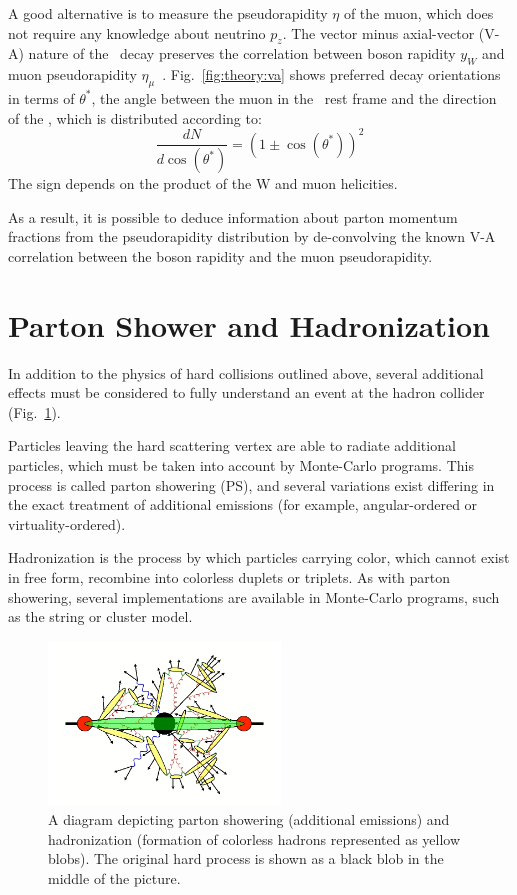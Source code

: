 A good alternative is to measure the pseudorapidity $\eta$ of the muon, which does not require any knowledge about neutrino $p_z$. The vector minus axial-vector (V-A) nature of the \Wboson\ decay preserves the correlation between boson rapidity $y_W$ and muon pseudorapidity $\eta_\mu$~\cite{MartinezOutschoorn:2011hta}. Fig.~\ref{fig:theory:va} shows preferred decay orientations in terms of $\theta^*$, the angle between the muon in the \Wboson\ rest frame and the direction of the \Wboson, which is distributed according to:
$$ \frac{dN}{d \cos(\theta^*)} = \left(1 \pm \cos(\theta^*) \right)^{2}$$
The sign depends on the product of the W and muon helicities.

As a result, it is possible to deduce information about parton momentum fractions from the pseudorapidity distribution by de-convolving the known V-A correlation between the boson rapidity and the muon pseudorapidity.

\section{Parton Shower and Hadronization}

In addition to the physics of hard collisions outlined above, several additional effects must be considered to fully understand an event at the hadron collider (Fig.~\ref{fig:theory:ps}).

Particles leaving the hard scattering vertex are able to radiate additional particles, which must be taken into account by Monte-Carlo programs. This process is called parton showering (PS), and several variations exist differing in the exact treatment of additional emissions (for example, angular-ordered or virtuality-ordered).

Hadronization is the process by which particles carrying color, which cannot exist in free form, recombine into colorless duplets or triplets. As with parton showering, several implementations are available in Monte-Carlo programs, such as the string or cluster model.

\begin{figure}[phtb]
  \begin{center}
    \includegraphics[width=0.55\textwidth]{theory/fig/ps}
    \caption{ A diagram depicting parton showering (additional emissions) and hadronization (formation of colorless hadrons represented as yellow blobs). The original hard process is shown as a black blob in the middle of the picture.}
    \label{fig:theory:ps}
 \end{center}
\end{figure}

